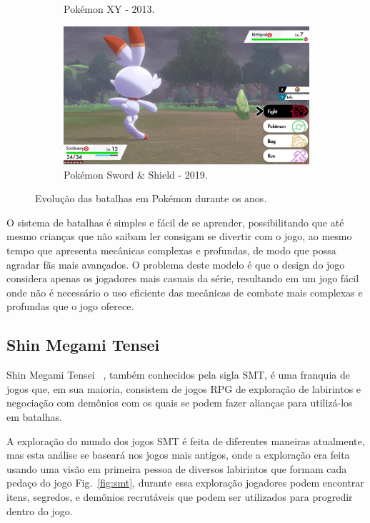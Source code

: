 \documentclass[
	12pt,				%
	openright,			%
	twoside,			%
	a4paper,			%
	english,			%
	french,				%
	spanish,			%
	brazil				%
	]{abntex2}
\begin{document}
\begin{figure}[h!]
\begin{subfigure}[b]{0.6\linewidth}
    \caption{Pokémon XY - 2013.}
  \end{subfigure}
  \begin{subfigure}[b]{0.6\linewidth}
    \includegraphics[width=\linewidth]{swsh.jpg}
    \caption{Pokémon Sword \& Shield - 2019.}
  \end{subfigure}
  \caption{Evolução das batalhas em Pokémon durante os anos.}
  \label{fig:pokemon2}
\end{figure}

O sistema de batalhas é simples e fácil de se aprender, possibilitando que até mesmo crianças que não saibam ler consigam se divertir com o jogo, ao mesmo tempo que apresenta mecânicas complexas e profundas, de modo que possa agradar fãs mais avançados. O problema deste modelo é que o design do jogo considera apenas os jogadores mais casuais da série, resultando em um jogo fácil onde não é necessário o uso eficiente das mecânicas de combate mais complexas e profundas que o jogo oferece.

\subsection{Shin Megami Tensei}

Shin Megami Tensei ~\cite{SMT}, também conhecidos pela sigla SMT, é uma franquia de jogos que, em sua maioria, consistem de jogos RPG de exploração de labirintos e negociação com demônios com os quais se podem fazer alianças para utilizá-los em batalhas.

	A exploração do mundo dos jogos SMT é feita de diferentes maneiras atualmente, mas esta análise se baseará nos jogos mais antigos, onde a exploração era feita usando uma visão em primeira pessoa de diversos labirintos que formam cada pedaço do jogo Fig.~\ref{fig:smt}, durante essa exploração jogadores podem encontrar itens, segredos, e demônios recrutáveis que podem ser utilizados para progredir dentro do jogo.
\end{document}
